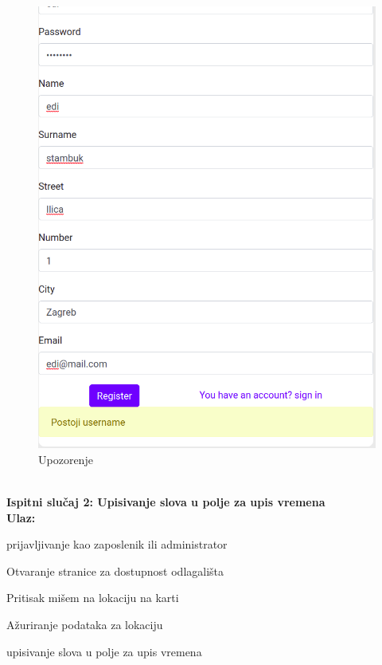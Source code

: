 		
			\begin{figure}[H]
				\includegraphics[scale=0.4]{slike/Upozorenje.png}
				\centering
				\caption{Upozorenje}
				\label{fig:Upozorenje}
			\end{figure}
			
			\text{}\\
		
		
			\textbf{Ispitni slučaj 2: Upisivanje slova u polje za upis vremena}
			\text{}\\
			
			\textbf{Ulaz:}
			
			\begin{packed_enum}
				\item{prijavljivanje kao zaposlenik ili administrator}
				\item{Otvaranje stranice za dostupnost odlagališta}
				\item{Pritisak mišem na lokaciju na karti}
				\item{Ažuriranje podataka za lokaciju}
				\item{upisivanje slova u polje za upis vremena}
			\end{packed_enum}
			
